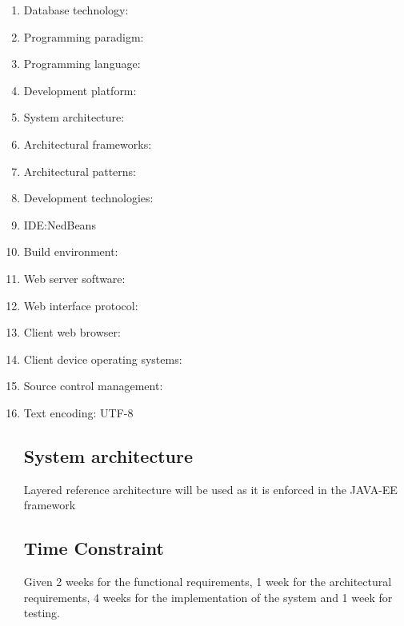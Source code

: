  
%

	\begin{enumerate}
		\item Database technology: 
		\item Programming paradigm: 
		\item Programming language: 
		\item Development platform:  
		\item System architecture: 
		\item Architectural frameworks: 
		\item Architectural patterns: 
		\item Development technologies:
		\item IDE:NedBeans
		\item Build environment:
		\item Web server software:
		\item Web interface protocol:
		\item Client web browser:
		\item Client device operating systems:
		\item Source control management: 
		\item Text encoding: UTF-8
		
		
			\subsection{System architecture}
				Layered reference architecture will be used as it is enforced in the JAVA-EE framework
				
			\subsection{Time Constraint }		
					Given 2 weeks for the functional requirements, 1 week for the architectural requirements, 4 weeks 							for the implementation of the system and 1 week for testing.	
					
		

		
					
				
				
	\end{enumerate}

%
